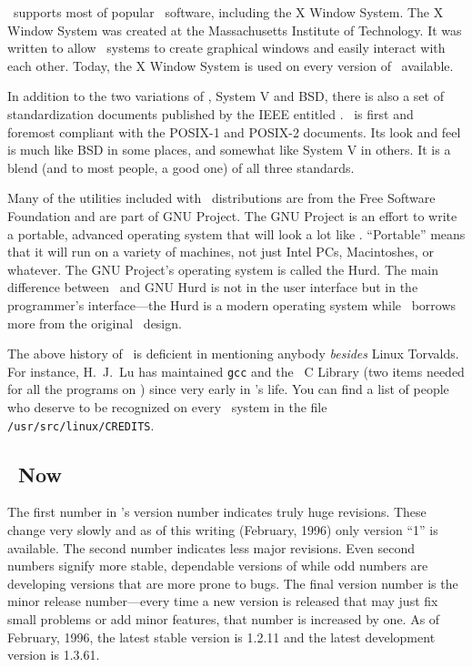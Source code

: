 \linux\ supports most of popular \unix\ software, including the X
Window System.  The X Window System was created
at the Massachusetts Institute of 
Technology.  It was
written to allow \unix\ systems to create graphical windows and easily
interact with each other.  Today, the X Window System is used on every
version of \unix\ available.

In addition to the two variations of \unix, System V and BSD, there is
also a set of standardization documents published by the
IEEE entitled .  \linux\ is first and
foremost compliant with the POSIX-1 and POSIX-2
documents.  Its look and feel is much like BSD in some
places, and somewhat like System V in others.  It is a blend (and to
most people, a good one) of all three standards.

Many of the utilities included with \linux\ distributions are from the
Free Software Foundation and are part
of GNU Project.  The GNU Project is an effort to
write a portable, advanced operating system that will look a lot like
\unix.  ``Portable'' means that it will run on a variety of machines,
not just Intel PCs, Macintoshes, or whatever.  The GNU
Project's operating system is called the Hurd.  The
main difference between \linux\ and GNU Hurd is not in the user
interface but in the programmer's interface---the Hurd is a modern
operating system while \linux\ borrows more from the original \unix\
design.

The above history of \linux\ is deficient in mentioning anybody
\emph{besides} Linux Torvalds.  For instance, H.~J.~Lu\index{Lu,
  H.~J.} has maintained {\tt gcc} and the \linux\ C Library (two items
needed for all the programs on \linux) since very early in \linux's
life.  You can find a list of people who deserve to be recognized on
every \linux\ system in the file {\tt /usr/src/linux/CREDITS}.

\subsection{\linux\ Now}

The first number in \linux's version number indicates truly huge
revisions.  These change very slowly and as of this writing (February,
1996) only version ``1'' is available.  The second number indicates
less major revisions.  Even second numbers signify more stable,
dependable versions of \linux while odd numbers are developing
versions that are more prone to bugs.  The final version number is the
minor release number---every time a new version is released that may
just fix small problems or add minor features, that number is
increased by one.  As of February, 1996, the latest stable version is
1.2.11 and the latest development version is 1.3.61.

